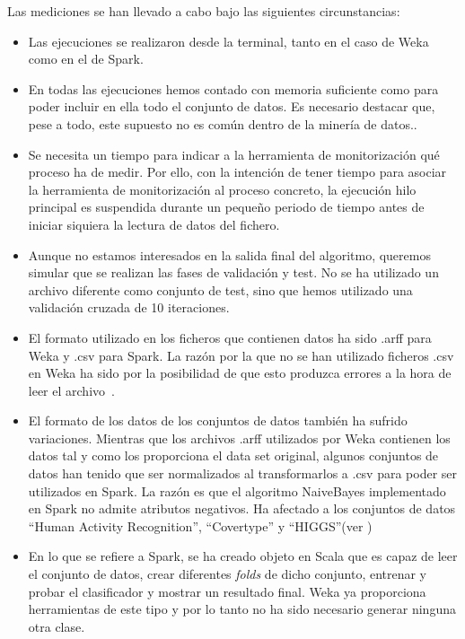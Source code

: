 Las mediciones se han llevado a cabo bajo las siguientes circunstancias:

\begin{itemize}
	\item Las ejecuciones se realizaron desde la terminal, tanto en el caso de Weka como en el de Spark.
	\item En todas las ejecuciones hemos contado con memoria suficiente como para poder incluir en ella todo el conjunto de datos. Es necesario destacar que, pese a todo, este supuesto no es común dentro de la minería de datos..
	\item Se necesita un tiempo para indicar a la herramienta de monitorización qué proceso ha de medir. Por ello, con la intención de tener tiempo para asociar la herramienta de monitorización al proceso concreto, la ejecución hilo principal es suspendida durante un pequeño periodo de tiempo antes de iniciar siquiera la lectura de datos del fichero.
	\item Aunque no estamos interesados en la salida final del algoritmo, queremos simular que se realizan las fases de validación y test. No se ha utilizado un archivo diferente como conjunto de test, sino que hemos utilizado una validación cruzada de 10 iteraciones.
	\item El formato utilizado en los ficheros que contienen datos ha sido .arff para Weka y .csv para Spark. La razón por la que no se han utilizado ficheros .csv en Weka ha sido por la posibilidad de que esto produzca errores a la hora de leer el archivo~\cite{CSVWeka}.
	\item El formato de los datos de los conjuntos de datos también ha sufrido variaciones. Mientras que los archivos .arff utilizados por Weka contienen los datos tal y como los proporciona el data set original, algunos conjuntos de datos han tenido que ser normalizados al transformarlos a .csv para poder ser utilizados en Spark. La razón es que el algoritmo NaiveBayes implementado en Spark no admite atributos negativos. Ha afectado a los conjuntos de datos ``Human Activity Recognition'', ``Covertype'' y ``HIGGS''(ver ) 
	\item En lo que se refiere a Spark, se ha creado objeto en Scala que es capaz de leer el conjunto de datos, crear diferentes \textit{folds} de dicho conjunto, entrenar y probar el clasificador y mostrar un resultado final. Weka ya proporciona herramientas de este tipo y por lo tanto no ha sido necesario generar ninguna otra clase.
	
\end{itemize}

